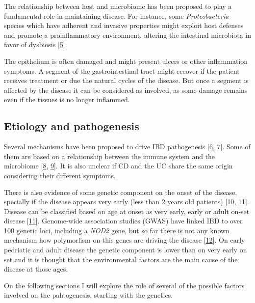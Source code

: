 \documentclass[
  12pt,
  a4paper,
  twoside,
  openright]{book}
\begin{document}
The relationship between host and microbiome has been proposed to play a fundamental role in maintaining disease.
For instance, some \emph{Proteobacteria} species which have adherent and invasive properties might exploit host defenses and promote a proinflammatory environment, altering the intestinal microbiota in favor of dysbiosis {[}\protect\hyperlink{ref-mukhopadhya2012}{5}{]}.

The epithelium is often damaged and might present ulcers or other inflammation symptoms.
A segment of the gastrointestinal tract might recover if the patient receives treatment or due the natural cycles of the disease.
But once a segment is affected by the disease it can be considered as involved, as some damage remains even if the tissues is no longer inflammed.

\hypertarget{etiology-and-pathogenesis}{%
\subsection{Etiology and pathogenesis}\label{etiology-and-pathogenesis}}

Several mechanisms have been proposed to drive IBD pathogenesis {[}\protect\hyperlink{ref-zhang2014}{6}, \protect\hyperlink{ref-hugot2004}{7}{]}.
Some of them are based on a relationship between the immune system and the microbiome {[}\protect\hyperlink{ref-silva2016}{8}, \protect\hyperlink{ref-demattos2015}{9}{]}.
It is also unclear if CD and the UC share the same origin considering their different symptoms.

There is also evidence of some genetic component on the onset of the disease, specially if the disease appears very early (less than 2 years old patients) {[}\protect\hyperlink{ref-mcgovern2015}{10}, \protect\hyperlink{ref-satsangi2006}{11}{]}.
Disease can be classified based on age at onset as very early, early or adult on-set disease {[}\protect\hyperlink{ref-satsangi2006}{11}{]}.
Genome-wide association studies (GWAS) have linked IBD to over 100 genetic loci, including a \emph{NOD2} gene, but so far there is not any known mechanism how polymorfism on this genes are driving the disease {[}\protect\hyperlink{ref-horowitz2021}{12}{]}.
On early pedriatic and adult disease the genetic component is lower than on very early on set and it is thought that the environmental factors are the main cause of the disease at those ages.

On the following sections I will explore the role of several of the possible factors involved on the pahtogenesis, starting with the genetics.
\end{document}
